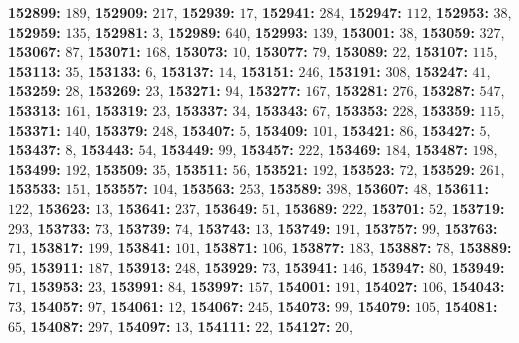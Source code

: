 \textsf{\bfseries 152899:} $189$, \textsf{\bfseries 152909:} $217$, \textsf{\bfseries 152939:} $17$, \textsf{\bfseries 152941:} $284$, \textsf{\bfseries 152947:} $112$, \textsf{\bfseries 152953:} $38$, \textsf{\bfseries 152959:} $135$, \textsf{\bfseries 152981:} $3$, \textsf{\bfseries 152989:} $640$, \textsf{\bfseries 152993:} $139$, \textsf{\bfseries 153001:} $38$, \textsf{\bfseries 153059:} $327$, \textsf{\bfseries 153067:} $87$, \textsf{\bfseries 153071:} $168$, \textsf{\bfseries 153073:} $10$, \textsf{\bfseries 153077:} $79$, \textsf{\bfseries 153089:} $22$, \textsf{\bfseries 153107:} $115$, \textsf{\bfseries 153113:} $35$, \textsf{\bfseries 153133:} $6$, \textsf{\bfseries 153137:} $14$, \textsf{\bfseries 153151:} $246$, \textsf{\bfseries 153191:} $308$, \textsf{\bfseries 153247:} $41$, \textsf{\bfseries 153259:} $28$, \textsf{\bfseries 153269:} $23$, \textsf{\bfseries 153271:} $94$, \textsf{\bfseries 153277:} $167$, \textsf{\bfseries 153281:} $276$, \textsf{\bfseries 153287:} $547$, \textsf{\bfseries 153313:} $161$, \textsf{\bfseries 153319:} $23$, \textsf{\bfseries 153337:} $34$, \textsf{\bfseries 153343:} $67$, \textsf{\bfseries 153353:} $228$, \textsf{\bfseries 153359:} $115$, \textsf{\bfseries 153371:} $140$, \textsf{\bfseries 153379:} $248$, \textsf{\bfseries 153407:} $5$, \textsf{\bfseries 153409:} $101$, \textsf{\bfseries 153421:} $86$, \textsf{\bfseries 153427:} $5$, \textsf{\bfseries 153437:} $8$, \textsf{\bfseries 153443:} $54$, \textsf{\bfseries 153449:} $99$, \textsf{\bfseries 153457:} $222$, \textsf{\bfseries 153469:} $184$, \textsf{\bfseries 153487:} $198$, \textsf{\bfseries 153499:} $192$, \textsf{\bfseries 153509:} $35$, \textsf{\bfseries 153511:} $56$, \textsf{\bfseries 153521:} $192$, \textsf{\bfseries 153523:} $72$, \textsf{\bfseries 153529:} $261$, \textsf{\bfseries 153533:} $151$, \textsf{\bfseries 153557:} $104$, \textsf{\bfseries 153563:} $253$, \textsf{\bfseries 153589:} $398$, \textsf{\bfseries 153607:} $48$, \textsf{\bfseries 153611:} $122$, \textsf{\bfseries 153623:} $13$, \textsf{\bfseries 153641:} $237$, \textsf{\bfseries 153649:} $51$, \textsf{\bfseries 153689:} $222$, \textsf{\bfseries 153701:} $52$, \textsf{\bfseries 153719:} $293$, \textsf{\bfseries 153733:} $73$, \textsf{\bfseries 153739:} $74$, \textsf{\bfseries 153743:} $13$, \textsf{\bfseries 153749:} $191$, \textsf{\bfseries 153757:} $99$, \textsf{\bfseries 153763:} $71$, \textsf{\bfseries 153817:} $199$, \textsf{\bfseries 153841:} $101$, \textsf{\bfseries 153871:} $106$, \textsf{\bfseries 153877:} $183$, \textsf{\bfseries 153887:} $78$, \textsf{\bfseries 153889:} $95$, \textsf{\bfseries 153911:} $187$, \textsf{\bfseries 153913:} $248$, \textsf{\bfseries 153929:} $73$, \textsf{\bfseries 153941:} $146$, \textsf{\bfseries 153947:} $80$, \textsf{\bfseries 153949:} $71$, \textsf{\bfseries 153953:} $23$, \textsf{\bfseries 153991:} $84$, \textsf{\bfseries 153997:} $157$, \textsf{\bfseries 154001:} $191$, \textsf{\bfseries 154027:} $106$, \textsf{\bfseries 154043:} $73$, \textsf{\bfseries 154057:} $97$, \textsf{\bfseries 154061:} $12$, \textsf{\bfseries 154067:} $245$, \textsf{\bfseries 154073:} $99$, \textsf{\bfseries 154079:} $105$, \textsf{\bfseries 154081:} $65$, \textsf{\bfseries 154087:} $297$, \textsf{\bfseries 154097:} $13$, \textsf{\bfseries 154111:} $22$, \textsf{\bfseries 154127:} $20$, 
